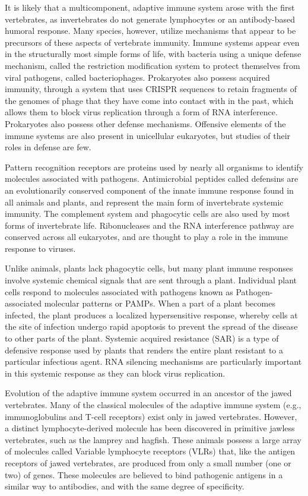 It is likely that a multicomponent, adaptive immune system arose with the first vertebrates, as invertebrates do not generate lymphocytes or an antibody-based humoral response. Many species, however, utilize mechanisms that appear to be precursors of these aspects of vertebrate immunity. Immune systems appear even in the structurally most simple forms of life, with bacteria using a unique defense mechanism, called the restriction modification system to protect themselves from viral pathogens, called bacteriophages. Prokaryotes also possess acquired immunity, through a system that uses CRISPR sequences to retain fragments of the genomes of phage that they have come into contact with in the past, which allows them to block virus replication through a form of RNA interference. Prokaryotes also possess other defense mechanisms. Offensive elements of the immune systems are also present in unicellular eukaryotes, but studies of their roles in defense are few.

Pattern recognition receptors are proteins used by nearly all organisms to identify molecules associated with pathogens. Antimicrobial peptides called defensins are an evolutionarily conserved component of the innate immune response found in all animals and plants, and represent the main form of invertebrate systemic immunity. The complement system and phagocytic cells are also used by most forms of invertebrate life. Ribonucleases and the RNA interference pathway are conserved across all eukaryotes, and are thought to play a role in the immune response to viruses.

Unlike animals, plants lack phagocytic cells, but many plant immune responses involve systemic chemical signals that are sent through a plant. Individual plant cells respond to molecules associated with pathogens known as Pathogen-associated molecular patterns or PAMPs. When a part of a plant becomes infected, the plant produces a localized hypersensitive response, whereby cells at the site of infection undergo rapid apoptosis to prevent the spread of the disease to other parts of the plant. Systemic acquired resistance (SAR) is a type of defensive response used by plants that renders the entire plant resistant to a particular infectious agent. RNA silencing mechanisms are particularly important in this systemic response as they can block virus replication.

Evolution of the adaptive immune system occurred in an ancestor of the jawed vertebrates. Many of the classical molecules of the adaptive immune system (e.g., immunoglobulins and T-cell receptors) exist only in jawed vertebrates. However, a distinct lymphocyte-derived molecule has been discovered in primitive jawless vertebrates, such as the lamprey and hagfish. These animals possess a large array of molecules called Variable lymphocyte receptors (VLRs) that, like the antigen receptors of jawed vertebrates, are produced from only a small number (one or two) of genes. These molecules are believed to bind pathogenic antigens in a similar way to antibodies, and with the same degree of specificity.



